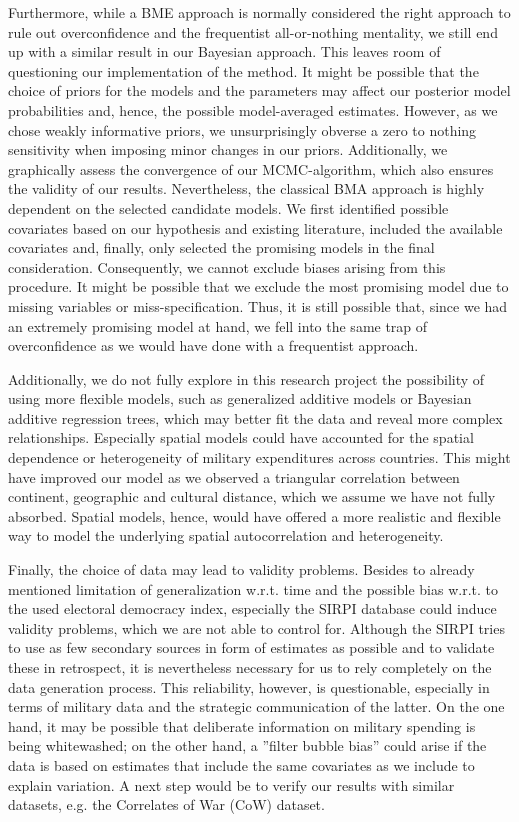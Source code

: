 \documentclass[12pt,a4paper]{article}
\begin{document}
Furthermore, while a BME approach is normally considered the right approach to rule out overconfidence and the frequentist all-or-nothing mentality, we still end up with a similar result in our Bayesian approach. This leaves room of questioning our implementation of the method. It might be possible that the choice of priors for the models and the parameters may affect our posterior model probabilities and, hence, the possible model-averaged estimates. However, as we chose weakly informative priors, we unsurprisingly obverse a zero to nothing sensitivity when imposing minor changes in our priors. Additionally, we graphically assess the convergence of our MCMC-algorithm, which also ensures the validity of our results. Nevertheless, the classical BMA approach is highly dependent on the selected candidate models. We first identified possible covariates based on our hypothesis and existing literature, included the available covariates and, finally, only selected the promising models in the final consideration. Consequently, we cannot exclude biases arising from this procedure. It might be possible that we exclude the most promising model due to missing variables or miss-specification. Thus, it is still possible that, since we had an extremely promising model at hand, we fell into the same trap of overconfidence as we would have done with a frequentist approach.

Additionally, we do not fully explore in this research project the possibility of using more flexible models, such as generalized additive models or Bayesian additive regression trees, which may better fit the data and reveal more complex relationships. Especially spatial models could have accounted for the spatial dependence or heterogeneity of military expenditures across countries. This might have improved our model as we observed a triangular correlation between continent, geographic and cultural distance, which we assume we have not fully absorbed. Spatial models, hence, would have offered a more realistic and flexible way to model the underlying spatial autocorrelation and heterogeneity.

Finally, the choice of data may lead to validity problems. Besides to already mentioned limitation of generalization w.r.t. time and the possible bias w.r.t. to the used electoral democracy index, especially the SIRPI database could induce validity problems, which we are not able to control for. Although the SIRPI tries to use as few secondary sources in form of estimates as possible and to validate these in retrospect, it is nevertheless necessary for us to rely completely on the data generation process. This reliability, however, is questionable, especially in terms of military data and the strategic communication of the latter. On the one hand, it may be possible that deliberate information on military spending is being whitewashed; on the other hand, a ''filter bubble bias'' could arise if the data is based on estimates that include the same covariates as we include to explain variation. A next step would be to verify our results with similar datasets, e.g. the Correlates of War (CoW) dataset.
\end{document}
